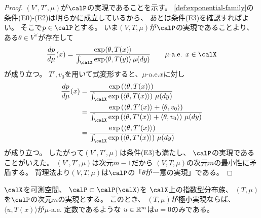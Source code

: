 \documentclass[report]{jlreq}
\begin{document}
\begin{proof}
    $(V', T', \mu)$が$\calP$の実現であることを示す。
    \cref{def:exponential-family}の条件(E0)-(E2)は明らかに成立しているから、
    あとは条件(E3)を確認すればよい。
    そこで$p \in \calP$とする。
    いま$(V, T, \mu)$が$\calP$の実現であることより、
    ある$\theta \in V^\vee$が存在して
    \begin{equation}
        \dd[p]{\mu}(x)
            = \frac{
                \exp\langle \theta, T(x) \rangle
            }{
                \int_{\calX} \exp\langle \theta, T(y) \rangle \, \mu(dy)
            }
            \qquad
            \text{$\mu$-a.e. $x \in \calX$}
    \end{equation}
    が成り立つ。
    $T', v_0$を用いて式変形すると、$\mu$-a.e.$x$に対し
    \begin{alignat}{1}
        \dd[p]{\mu}(x)
            &= \frac{
                \exp\myparen{
                    \langle \theta, T(x) \rangle
                }
            }{
                \int_{\calX} \exp\myparen{
                    \langle \theta, T(x) \rangle
                } \, \mu(dy)
            } \\
            &= \frac{
                \exp\myparen{
                    \langle \theta, T'(x) \rangle
                    + \langle \theta, v_0 \rangle
                }
            }{
                \int_{\calX} \exp\myparen{
                    \langle \theta, T'(x) \rangle
                    + \langle \theta, v_0 \rangle
                } \, \mu(dy)
            } \\
            &= \frac{
                \exp\myparen{
                    \langle \theta, T'(x) \rangle
                }
            }{
                \int_{\calX} \exp\myparen{
                    \langle \theta, T'(x) \rangle
                } \, \mu(dy)
            }
    \end{alignat}
    が成り立つ。
    したがって$(V', T', \mu)$は条件(E3)も満たし、
    $\calP$の実現であることがいえた。
    $(V', T', \mu)$は次元$m - 1$だから
    $(V, T, \mu)$の次元$m$の最小性に矛盾する。
    背理法より$(V, T, \mu)$は$\calP$の「$\theta$が一意の実現」である。
\end{proof}

\begin{theorem}[極小実現の性質]
    $\calX$を可測空間、
    $\calP \subset \calP(\calX)$を
    $\calX$上の指数型分布族、
    $(T, \mu)$を$\calP$の次元$m$の実現とする。
    このとき、
    $(T, \mu)$が極小実現ならば、
    $\langle u, T(x) \rangle$が$\mu$-a.e. 定数であるような
    $u \in \mathbb{R}^m$は$u = 0$のみである。
\end{theorem}
\end{document}
